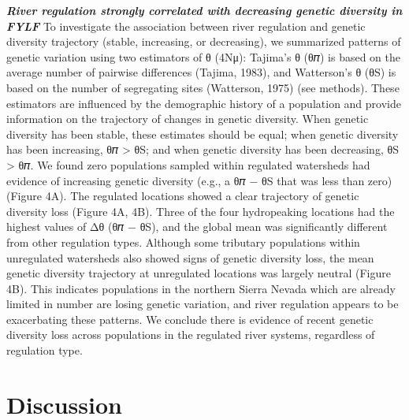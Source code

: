 \documentclass[twoside,12pt,final]{ucthesis-CA2012} %
\begin{document}
\begin{ucmainmatter}
\textbf{\emph{River regulation strongly correlated with decreasing
genetic diversity in FYLF}} To investigate the association between river
regulation and genetic diversity trajectory (stable, increasing, or
decreasing), we summarized patterns of genetic variation using two
estimators of θ (4Nμ): Tajima's θ (θ𝜋) is based on the average number of
pairwise differences (Tajima, 1983), and Watterson's θ (θS) is based on
the number of segregating sites (Watterson, 1975) (see methods). These
estimators are influenced by the demographic history of a population and
provide information on the trajectory of changes in genetic diversity.
When genetic diversity has been stable, these estimates should be equal;
when genetic diversity has been increasing, θ𝜋 \textgreater{} θS; and
when genetic diversity has been decreasing, θS \textgreater{} θ𝜋. We
found zero populations sampled within regulated watersheds had evidence
of increasing genetic diversity (e.g., a θ𝜋 − θS that was less than
zero) (Figure 4A). The regulated locations showed a clear trajectory of
genetic diversity loss (Figure 4A, 4B). Three of the four hydropeaking
locations had the highest values of Δθ (θ𝜋 − θS), and the global mean
was significantly different from other regulation types. Although some
tributary populations within unregulated watersheds also showed signs of
genetic diversity loss, the mean genetic diversity trajectory at
unregulated locations was largely neutral (Figure 4B). This indicates
populations in the northern Sierra Nevada which are already limited in
number are losing genetic variation, and river regulation appears to be
exacerbating these patterns. We conclude there is evidence of recent
genetic diversity loss across populations in the regulated river
systems, regardless of regulation type.

\hypertarget{discussion}{%
\section{Discussion}\label{discussion}}


\end{ucmainmatter}
\end{document}
